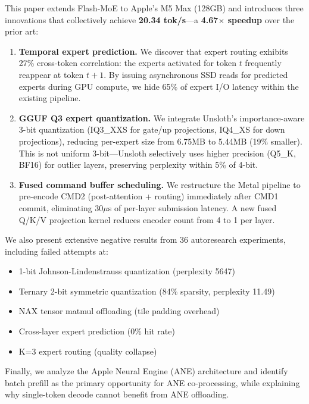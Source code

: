 \documentclass[11pt,twocolumn]{article}
\begin{document}
This paper extends Flash-MoE to Apple's M5 Max (128GB) and introduces three innovations that collectively achieve \textbf{20.34 tok/s}---a \textbf{4.67$\times$ speedup} over the prior art:

\begin{enumerate}
    \item \textbf{Temporal expert prediction.} We discover that expert routing exhibits 27\% cross-token correlation: the experts activated for token $t$ frequently reappear at token $t+1$. By issuing asynchronous SSD reads for predicted experts during GPU compute, we hide 65\% of expert I/O latency within the existing pipeline.

    \item \textbf{GGUF Q3 expert quantization.} We integrate Unsloth's importance-aware 3-bit quantization (IQ3\_XXS for gate/up projections, IQ4\_XS for down projections), reducing per-expert size from 6.75MB to 5.44MB (19\% smaller). This is not uniform 3-bit---Unsloth selectively uses higher precision (Q5\_K, BF16) for outlier layers, preserving perplexity within 5\% of 4-bit.

    \item \textbf{Fused command buffer scheduling.} We restructure the Metal pipeline to pre-encode CMD2 (post-attention + routing) immediately after CMD1 commit, eliminating 30$\mu$s of per-layer submission latency. A new fused Q/K/V projection kernel reduces encoder count from 4 to 1 per layer.
\end{enumerate}

We also present extensive negative results from 36 autoresearch experiments, including failed attempts at:
\begin{itemize}
    \item 1-bit Johnson-Lindenstrauss quantization (perplexity 5647)
    \item Ternary 2-bit symmetric quantization (84\% sparsity, perplexity 11.49)
    \item NAX tensor matmul offloading (tile padding overhead)
    \item Cross-layer expert prediction (0\% hit rate)
    \item K=3 expert routing (quality collapse)
\end{itemize}

Finally, we analyze the Apple Neural Engine (ANE) architecture and identify batch prefill as the primary opportunity for ANE co-processing, while explaining why single-token decode cannot benefit from ANE offloading.
\end{document}
